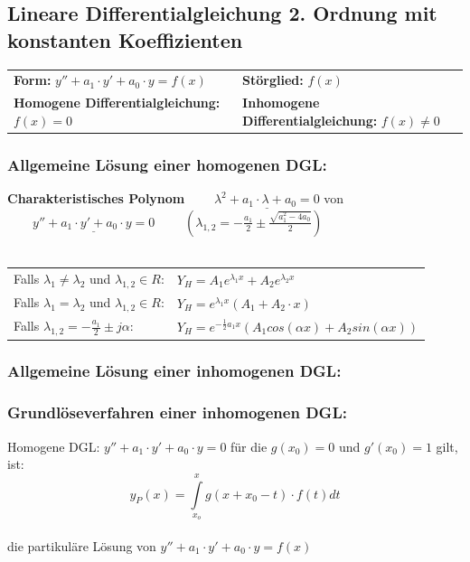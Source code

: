 \subsection{Lineare Differentialgleichung 2. Ordnung mit konstanten 
Koeffizienten }
\begin{tabular}{p{8cm}p{8cm}}
\textbf{Form:} $y''+a_1\cdot y'+a_0\cdot y=f(x)$  &
\textbf{Störglied:} $f(x)$\\
\textbf{Homogene Differentialgleichung:} $f(x)=0$ &
\textbf{Inhomogene Differentialgleichung:} $f(x)\neq 0$
\end{tabular}

\subsubsection{Allgemeine Lösung einer homogenen DGL:\quad{}}
\textbf{Charakteristisches Polynom}
$\qquad\underline{\lambda^2+a_1\cdot\lambda+a_0=0}$ \hspace{1cm}von
$\qquad\underline{y''+a_1\cdot y'+a_0\cdot y=0}$ 
$\qquad(\lambda_{1,2} = -\frac{a_1}{2} \pm \frac{\sqrt{a_1^2 - 4a_0}}{2})$\\ \\
\begin{tabular}{p{8cm}p{8cm}}
Falls $\lambda_1\neq \lambda_2$ und $\lambda_{1,2} \in R$:&
$Y_H=A_1e^{\lambda_1x}+A_2e^{\lambda_2x}$\\
Falls $\lambda_1=\lambda_2$ und $\lambda_{1,2} \in R$:    &
$Y_H=e^{\lambda_1x}(A_1+A_2\cdot x)$\\
Falls $\lambda_{1,2}=-\frac{a_1}{2}\pm j\alpha$:          &
$Y_H=e^{-\frac{1}{2}a_1x}(A_1cos(\alpha x) +A_2sin(\alpha x))$\\
\end{tabular}

\subsubsection{Allgemeine Lösung einer inhomogenen DGL:\quad{}}

\subsubsection{Grundlöseverfahren einer inhomogenen DGL:\quad{}}
Homogene DGL: $y''+a_1\cdot y'+a_0\cdot y=0$  für die  $g(x_0)=0$  und
$g'(x_0)=1$  gilt, ist:\\
$$y_P(x)=\int\limits_{x_o}^{x} g(x+x_0-t)\cdot f(t)dt$$\\
die partikuläre Lösung von $y''+a_1\cdot y'+a_0\cdot y=f(x)$

